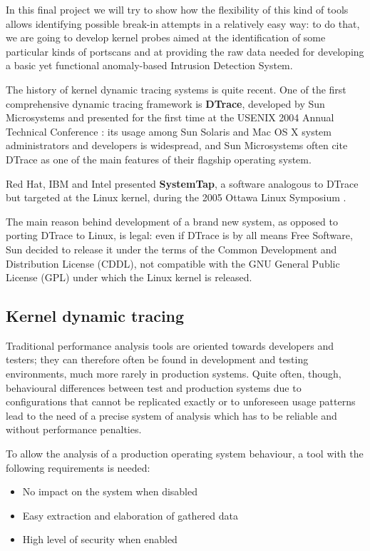 \documentclass[11pt]{article}
\begin{document}
In this final project we will try to show how the flexibility of this kind of
tools allows identifying possible break-in attempts in a relatively easy way:
to do that, we are going to develop kernel probes aimed at the identification
of some particular kinds of portscans and at providing the raw data needed for
developing a basic yet functional anomaly-based Intrusion Detection System.

The history of kernel dynamic tracing systems is quite recent. One of the first
comprehensive dynamic tracing framework is \textbf{DTrace}, developed by Sun
Microsystems and presented for the first time at the USENIX 2004 Annual
Technical Conference \cite{dtrace2004}: its usage among Sun Solaris and Mac OS
X system administrators and developers is widespread, and Sun Microsystems
often cite DTrace as one of the main features of their flagship operating
system.

Red Hat, IBM and Intel presented \textbf{SystemTap}, a software analogous to
DTrace but targeted at the Linux kernel, during the 2005 Ottawa Linux Symposium
\cite{vara2005}.

The main reason behind development of a brand new system, as opposed to porting
DTrace to Linux, is legal: even if DTrace is by all means Free Software, Sun
decided to release it under the terms of the Common Development and
Distribution License (CDDL), not compatible with the GNU General Public License
(GPL) under which the Linux kernel is released.

\subsection{Kernel dynamic tracing} 
\label{tracing:features}
Traditional performance analysis tools are oriented towards developers and
testers; they can therefore often be found in development and testing
environments, much more rarely in production systems. Quite often, though,
behavioural differences between test and production systems due to
configurations that cannot be replicated exactly or to unforeseen usage
patterns lead to the need of a precise system of analysis which has to be
reliable and without performance penalties.

To allow the analysis of a production operating system behaviour, a tool with
the following requirements is needed:

\begin{itemize}
    \item No impact on the system when disabled
    \item Easy extraction and elaboration of gathered data
    \item High level of security when enabled
\end{itemize}
\end{document}
